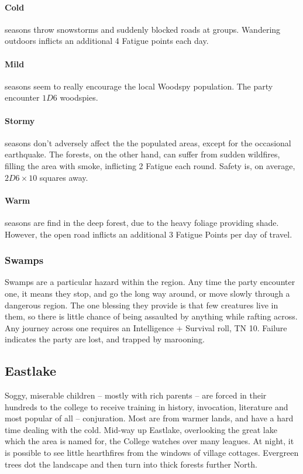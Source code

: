 \begin{multicols}{2}
\paragraph{Cold} seasons throw snowstorms and suddenly blocked roads at groups.
Wandering outdoors inflicts an additional 4 Fatigue points each day.
\paragraph{Mild} seasons seem to really encourage the local Woodspy population.
The party encounter $1D6$ woodspies.
\paragraph{Stormy} seasons don't adversely affect the the populated areas, except for the occasional earthquake.
The forests, on the other hand, can suffer from sudden wildfires, filling the area with smoke, inflicting 2 Fatigue each round.
Safety is, on average, $2D6 \times 10$ squares away.
\paragraph{Warm} seasons are find in the deep forest, due to the heavy foliage providing shade.
However, the open road inflicts an additional 3 Fatigue Points per day of travel.

\subsubsection{Swamps}

Swamps are a particular hazard within the region.
Any time the party encounter one, it means they stop, and go the long way around, or move slowly through a dangerous region.
The one blessing they provide is that few creatures live in them, so there is little chance of being assaulted by anything while rafting across.
Any journey across one requires an Intelligence + Survival roll, TN 10.
Failure indicates the party are lost, and trapped by marooning.

\subsection{Eastlake}

Soggy, miserable children -- mostly with rich parents -- are forced in their hundreds to the \gls{college} to receive training in history, invocation, literature and most popular of all -- conjuration.
Most are from warmer lands, and have a hard time dealing with the cold.
Mid-way up Eastlake, overlooking the great lake which the area is named for, the College watches over many leagues.
At night, it is possible to see little hearthfires from the windows of village cottages.
Evergreen trees dot the landscape and then turn into thick forests further North.


\end{multicols}
